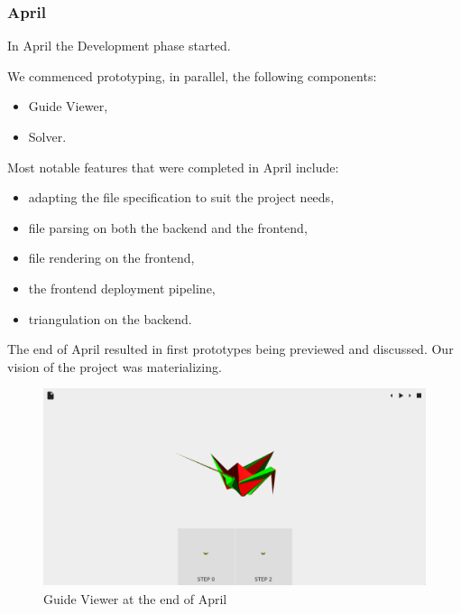 \subsubsection{April}

In April the Development phase started.

We commenced prototyping, in parallel, the following components:
\begin{itemize}
	\item Guide Viewer,
	\item Solver.
\end{itemize}

Most notable features that were completed in April include:
\begin{itemize}
	\item adapting the  file specification to suit the project needs,
	\item {} file parsing on both the backend and the frontend,
	\item {} file rendering on the frontend,
	\item the frontend deployment pipeline,
	\item triangulation on the backend.
\end{itemize}
The end of April resulted in first prototypes being previewed and discussed. Our vision of the project was materializing.

\begin{figure}[H]
	\label{04-first-prototypes}
	\caption{Guide Viewer at the end of April}
  \centering
    \includegraphics[width=1.01\textwidth]{assets/prototype-front-cut.png}
\end{figure}



